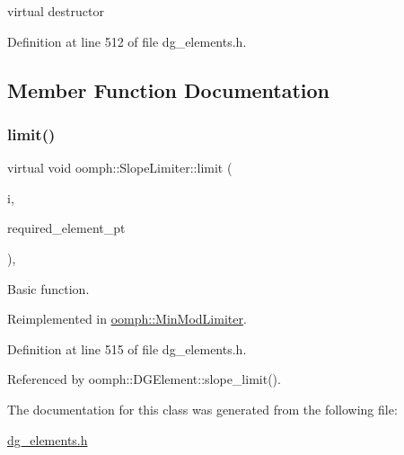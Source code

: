 virtual destructor 



Definition at line 512 of file dg\+\_\+elements.\+h.



\subsection{Member Function Documentation}
\mbox{\label{classoomph_1_1SlopeLimiter_a8b836449e68921bade7cd580fa2f6ba7}} 
\subsubsection{\texorpdfstring{limit()}{limit()}}
{\footnotesize\ttfamily virtual void oomph\+::\+Slope\+Limiter\+::limit (\begin{DoxyParamCaption}\item[{const unsigned \&}]{i,  }\item[{const \hyperlink{classoomph_1_1Vector}{Vector}$<$ \hyperlink{classoomph_1_1DGElement}{D\+G\+Element} $\ast$$>$ \&}]{required\+\_\+element\+\_\+pt }\end{DoxyParamCaption})\hspace{0.3cm}{\ttfamily [inline]}, {\ttfamily [virtual]}}



Basic function. 



Reimplemented in \hyperlink{classoomph_1_1MinModLimiter_a95858e125f3ce738f6591caf7827ee4d}{oomph\+::\+Min\+Mod\+Limiter}.



Definition at line 515 of file dg\+\_\+elements.\+h.



Referenced by oomph\+::\+D\+G\+Element\+::slope\+\_\+limit().



The documentation for this class was generated from the following file\+:\begin{DoxyCompactItemize}
\item 
\hyperlink{dg__elements_8h}{dg\+\_\+elements.\+h}\end{DoxyCompactItemize}
